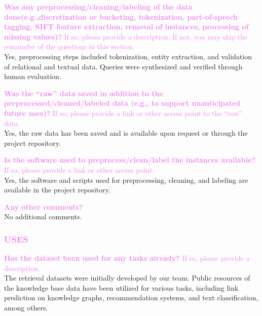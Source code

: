 \documentclass{article}
\newcommand{\sectioncolor}{Violet}
\begin{document}
    \textcolor{\sectioncolor}{\textbf{
    Was any preprocessing/cleaning/labeling of the data
    done(e.g.,discretization or bucketing, tokenization, part-of-speech
    tagging, SIFT feature extraction, removal of instances, processing of
    missing values)?
    }
    If so, please provide a description. If not, you may skip the remainder of
    the questions in this section.
    } \\
    Yes, preprocessing steps included tokenization, entity extraction, and validation of relational and textual data. Queries were synthesized and verified through human evaluation.

    \textcolor{\sectioncolor}{\textbf{
    Was the “raw” data saved in addition to the preprocessed/cleaned/labeled
    data (e.g., to support unanticipated future uses)?
    }
    If so, please provide a link or other access point to the “raw” data.
    } \\
    Yes, the raw data has been saved and is available upon request or through the project repository.

    \textcolor{\sectioncolor}{\textbf{
    Is the software used to preprocess/clean/label the instances available?
    }
    If so, please provide a link or other access point.
    } \\
    Yes, the software and scripts used for preprocessing, cleaning, and labeling are available in the project repository.

    \textcolor{\sectioncolor}{\textbf{
    Any other comments?
    }} \\
    No additional comments.

\begin{mdframed}[linecolor=\sectioncolor]
\subsubsection*{\textcolor{\sectioncolor}{
    USES
}}
\end{mdframed}

    \textcolor{\sectioncolor}{\textbf{
    Has the dataset been used for any tasks already?
    }
    If so, please provide a description.
    } \\
    The retrieval datasets were initially developed by our team. Public resources of the knowledge base data have been utilized for various tasks, including link prediction on knowledge graphs, recommendation systems, and text classification, among others. \\
\end{document}

